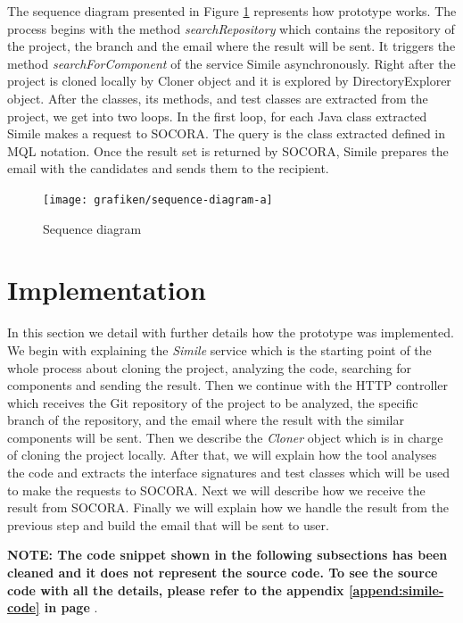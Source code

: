 The sequence diagram presented in Figure \ref{fig:sequence-diagram-a} represents how prototype works. The process begins with the method \emph{searchRepository} which contains the repository of the project, the branch and the email where the result will be sent. It triggers the method \emph{searchForComponent} of the service Simile asynchronously. Right after the project is cloned locally by Cloner object and it is explored by DirectoryExplorer object. After the classes, its methods, and test classes are extracted from the project, we get into two loops. In the first loop, for each Java class extracted Simile makes a request to SOCORA. The query is the class extracted defined in MQL notation. Once the result set is returned by SOCORA, Simile prepares the email with the candidates and sends them to the recipient.

\begin{figure}[H]
	\centering
    \texttt{[image: grafiken/sequence-diagram-a]}
    \caption{Sequence diagram}
    \label{fig:sequence-diagram-a}
\end{figure}

\section{Implementation}
In this section we detail with further details how the prototype was implemented. We begin with explaining the \emph{Simile} service which is the starting point of the whole process about cloning the project, analyzing the code, searching for components and sending the result. Then we continue with the  HTTP controller which receives the Git repository of the project to be analyzed, the specific branch of the repository, and the email where the result with the similar components will be sent. Then we describe the \emph{Cloner} object which is in charge of cloning the project locally. After that, we will explain how the tool analyses the code and extracts the interface signatures and test classes which will be used to make the requests to SOCORA. Next we will describe how we receive the result from SOCORA. Finally we will explain how we handle the result from the previous step and build the email that will be sent to user.

\textbf{NOTE: The code snippet shown in the following subsections has been cleaned and it does not represent the source code. To see the source code with all the details, please refer to the appendix \ref{append:simile-code} in page \pageref{append:simile-code}}.


